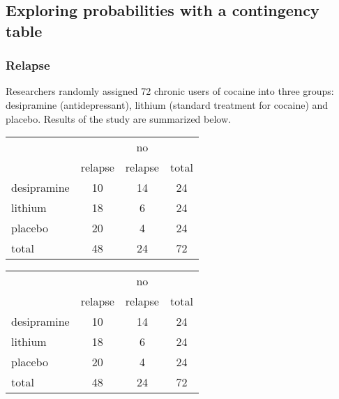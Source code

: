 \documentclass[slidestop,compress,mathserif]{beamer}
\begin{document}
\subsection{Exploring probabilities with a contingency table}


\begin{frame}
\frametitle{Relapse}

Researchers randomly assigned 72 chronic users of cocaine into three groups: desipramine (antidepressant), lithium (standard treatment for cocaine) and placebo. Results of the study are summarized below.

{\small
\begin{center}
\begin{tabular}{l | c c | c}
			& 		& no 		&  \\
			& relapse	& relapse	& total \\
\hline
desipramine	& 10		& 14		& 24 \\
lithium		& 18		& 6		& 24 \\
placebo		& 20		& 4		& 24 \\
\hline
total			& 48		& 24		& 72
\end{tabular}
\end{center}
}


\end{frame}


\begin{frame}



{\small
\begin{center}
\begin{tabular}{l | c c | c}
			& 		& no 		&  \\
			& relapse	& relapse	& total \\
\hline
desipramine	& 10		& 14		& 24 \\
lithium		& 18		& 6		& 24 \\
placebo		& 20		& 4		& 24 \\
\hline
total			& 48		& 24		& 72
\end{tabular}
\end{center}
}

\end{frame}

\end{document}
